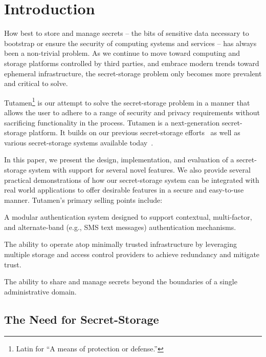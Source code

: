 \section{Introduction}
\label{sec:intro}

How best to store and manage secrets -- the bits of sensitive data
necessary to bootstrap or ensure the security of computing systems and
services -- has always been a non-trivial problem. As we continue to
move toward computing and storage platforms controlled by third
parties, and embrace modern trends toward ephemeral infrastructure,
the secret-storage problem only becomes more prevalent and critical to
solve.

Tutamen\footnote{Latin for ``A means of protection or defense.''} is
our attempt to solve the secret-storage problem in a manner that
allows the user to adhere to a range of security and privacy
requirements without sacrificing functionality in the process. Tutamen
is a next-generation secret-storage platform. It builds on our
previous secret-storage efforts~\cite{custos-trios} as well as various
secret-storage systems available today~\cite{vault, confidant,
  keywhiz}.

In this paper, we present the design, implementation, and evaluation
of a secret-storage system with support for several novel features. We
also provide several practical demonstrations of how our
secret-storage system can be integrated with real world applications
to offer desirable features in a secure and easy-to-use
manner. Tutamen's primary selling points include:
\begin{packed_item}
\item A modular authentication system designed to support contextual,
  multi-factor, and alternate-band (e.g., SMS text messages)
  authentication mechanisms.
\item The ability to operate atop minimally trusted infrastructure by
  leveraging multiple storage and access control providers to achieve
  redundancy and mitigate trust.
\item The ability to share and manage secrets beyond the boundaries
  of a single administrative domain.
\end{packed_item}

\subsection{The Need for Secret-Storage}

